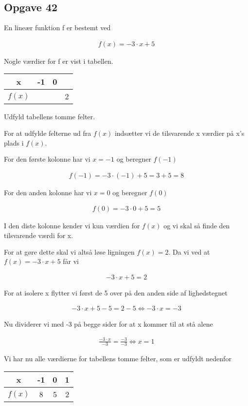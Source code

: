 \subsection{Opgave 42}

En lineær funktion f er bestemt ved 

\begin{align*}
    f(x) = -3\cdot x + 5
\end{align*}

Nogle værdier for f er vist i tabellen.

\begin{tabular}{|c|c|c|c|}
    \hline
    x & -1 & 0 & \\\hline
    $f(x)$ &  &  & 2 \\\hline 
\end{tabular}

Udfyld tabellens tomme felter.

\ans

For at udfylde felterne ud fra $f(x)$ indsætter vi de tilsvarende x værdier på x's plads i $f(x)$.

For den første kolonne har vi $x = -1$ og beregner $f(-1)$

\begin{align*}
    f(-1) = -3\cdot (-1) + 5 = 3 + 5 = 8
\end{align*}

For den anden kolonne har vi $x = 0$ og beregner $f(0)$

\begin{align*}
    f(0) = -3\cdot 0 + 5 = 5
\end{align*}

I den diste kolonne kender vi kun værdien for $f(x)$ og vi skal så finde den tilsvarende værdi for x.

For at gøre dette skal vi altså løse ligningen $f(x) = 2$. Da vi ved at $f(x) = -3\cdot x + 5$ får vi

\begin{align*}
    -3\cdot x + 5 = 2 
\end{align*}

For at isolere x flytter vi først de 5 over på den anden side af lighedstegnet

\begin{align*}
    -3\cdot x + 5 - 5 = 2 - 5 \Leftrightarrow -3\cdot x = -3
\end{align*}

Nu dividerer vi med -3 på begge sider for at x kommer til at stå alene

\begin{align*}
    \frac{-3\cdot x}{-3} = \frac{-3}{-3} \Leftrightarrow x = 1
\end{align*}

Vi har nu alle værdierne for tabellens tomme felter, som er udfyldt nedenfor

\begin{tabular}{|c|c|c|c|}
    \hline
    x & -1 & 0 & 1 \\\hline
    $f(x)$ & 8 & 5 & 2 \\\hline 
\end{tabular}